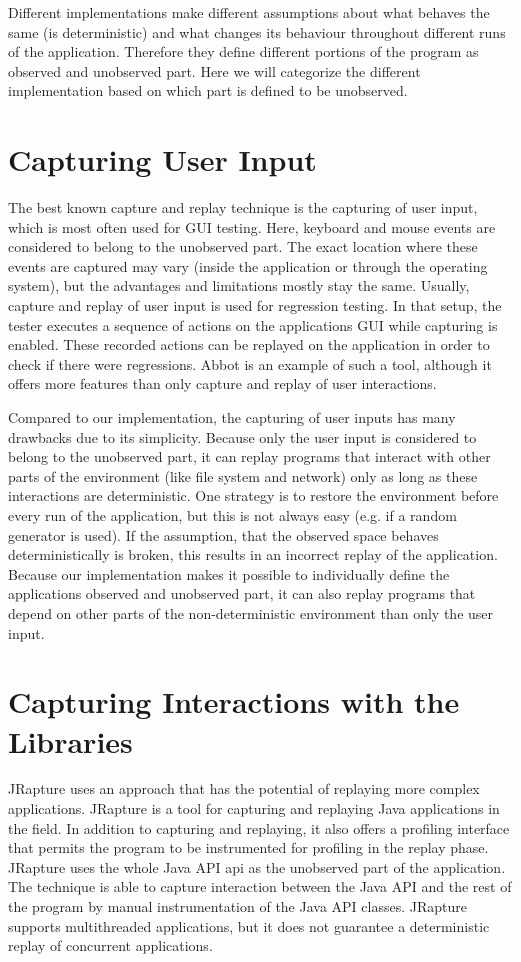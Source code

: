 Different implementations make different assumptions about what behaves the same (is deterministic) and what changes its behaviour throughout different runs of the application. Therefore they define different portions of the program as observed and unobserved part. Here we will categorize the different implementation based on which part is defined to be unobserved.

\section {Capturing User Input}
The best known capture and replay technique is the capturing of user input, which is most often used for GUI testing. Here, keyboard and mouse events are considered to belong to the unobserved part. The exact location where these events are captured may vary (inside the application or through the operating system), but the advantages and limitations mostly stay the same. Usually, capture and replay of user input is used for regression testing. In that setup, the tester executes a sequence of actions on the applications GUI while capturing is enabled. These recorded actions can be replayed on the application in order to check if there were regressions. Abbot \cite{abbot} is an example of such a tool, although it offers more features than only capture and replay of user interactions.

Compared to our implementation, the capturing of user inputs has many drawbacks due to its simplicity. Because only the user input is considered to belong to the unobserved part, it can replay programs that interact with other parts of the environment (like file system and network) only as long as these interactions are deterministic. One strategy is to restore the environment before every run of the application, but this is not always easy (e.g. if a random generator is used). If the assumption, that the observed space behaves deterministically is broken, this results in an incorrect replay of the application. Because our implementation makes it possible to individually define the applications observed and unobserved part, it can also replay programs that depend on other parts of the non-deterministic environment than only the user input.

\section {Capturing Interactions with the Libraries}
JRapture \cite{jrapture} uses an approach that has the potential of replaying more complex applications. JRapture is a tool for capturing and replaying Java applications in the field. In addition to capturing and replaying, it also offers a profiling interface that permits the program to be instrumented for profiling in the replay phase. JRapture uses the whole Java API api as the unobserved part of the application. The technique is able to capture interaction between the Java API and the rest of the program by manual instrumentation of the Java API classes. JRapture supports multithreaded applications, but it does not guarantee a deterministic replay of concurrent applications.

